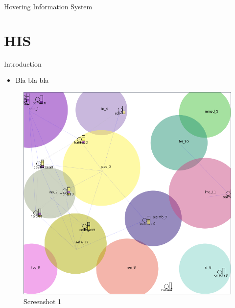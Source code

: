 \begin{frame}{Hovering Information System}
	\section{HIS}
	\begin{block}{Introduction}
		\begin{itemize}
			\item Bla bla bla
		\end{itemize}
	\end{block}
\end{frame}

\begin{frame}
	\begin{figure}
		\centering
		\includegraphics[height=\textheight]{../imgs/screen1.png}
		\caption{Screenshot 1}
		\label{fig:screens1}
	\end{figure}
\end{frame}
